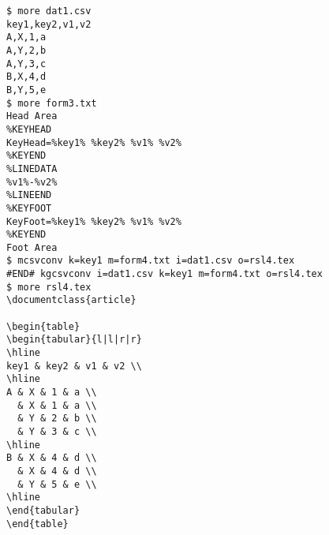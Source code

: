 \begin{Verbatim}[baselinestretch=0.7,frame=single]
$ more dat1.csv
key1,key2,v1,v2
A,X,1,a
A,Y,2,b
A,Y,3,c
B,X,4,d
B,Y,5,e
$ more form3.txt
Head Area
%KEYHEAD
KeyHead=%key1% %key2% %v1% %v2%
%KEYEND
%LINEDATA
%v1%-%v2%
%LINEEND
%KEYFOOT
KeyFoot=%key1% %key2% %v1% %v2%
%KEYEND
Foot Area
$ mcsvconv k=key1 m=form4.txt i=dat1.csv o=rsl4.tex
#END# kgcsvconv i=dat1.csv k=key1 m=form4.txt o=rsl4.tex
$ more rsl4.tex
\documentclass{article}

\begin{table}
\begin{tabular}{l|l|r|r}
\hline
key1 & key2 & v1 & v2 \\
\hline
A & X & 1 & a \\
  & X & 1 & a \\
  & Y & 2 & b \\
  & Y & 3 & c \\
\hline
B & X & 4 & d \\
  & X & 4 & d \\
  & Y & 5 & e \\
\hline
\end{tabular}
\end{table}

\end{Verbatim}
